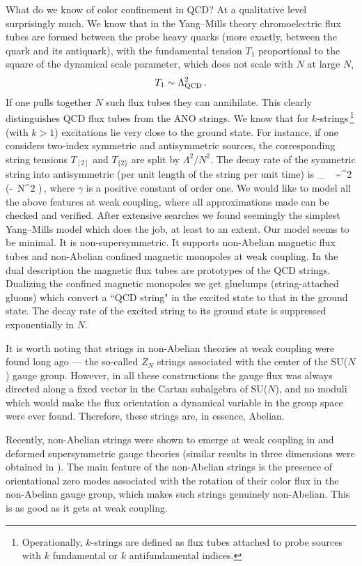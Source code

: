 What do we know of color confinement in QCD?
At a qualitative level surprisingly much.
We know that in the Yang--Mills theory
chromoelectric flux tubes are formed
between the probe heavy quarks (more exactly,
between the quark and its antiquark),
with the fundamental tension $T_1$ proportional to the square of the
dynamical scale parameter, which does not scale with $N$
at large $N$,
$$
T_1 \sim \Lambda^2_{\rm QCD}\, .
$$
If one pulls together $N$ such flux tubes
they can annihilate. This clearly distinguishes
QCD flux tubes from the ANO strings. We know that
for $k$-strings\,\footnote{Operationally,
$k$-strings are defined as flux tubes attached to probe sources
with $k$ fundamental or $k$ antifundamental indices.} (with $k>1$) excitations 
lie very close
to the ground state. For instance, if one considers
two-index symmetric and antisymmetric sources, the corresponding
string tensions $T_{[2]}$ and
$T_{\{2\}}$ are split 
\cite{Armoni-two} by $\Lambda^2/N^2$.
The decay rate 
of the symmetric string into antisymmetric (per unit length of the string per unit time)
is  
\beq
\Gamma_{\symm\,\, \to\, \asymm}\sim \Lambda^2 \exp\left(-\gamma \, N^2 \right)\,,
\label{expdec} 
\eeq
where $\gamma$ is a positive constant of  order one.
We would like to model all the above features at weak coupling,
where all approximations made can be checked and verified.
After extensive searches we found seemingly the simplest
Yang--Mills model which does the job, at least to an extent.
Our model seems to be minimal. It is non-supersymmetric.
It supports non-Abelian 
magnetic flux tubes and non-Abelian confined magnetic monopoles
at weak coupling.
In the dual description the magnetic flux tubes are prototypes
of the QCD strings. Dualizing the confined magnetic monopoles
we get gluelumps (string-attached gluons)
 which convert a ``QCD string" in the excited state
to that in the ground state. The decay rate of the excited string
to its ground state is suppressed exponentially in $N$.

It is worth  noting that strings
in non-Abelian theories at weak coupling were found long ago 
\cite{oldstrings} --- the so-called $Z_N$ strings associated with the center of 
the  SU($N$) gauge group. However, in all these constructions the gauge flux
was always directed along a fixed vector in the Cartan subalgebra 
of SU($N$), and no
moduli which would make the flux orientation
a dynamical variable  in the group space were ever found.
Therefore, these strings are, in essence, Abelian.

Recently, non-Abelian strings were shown to emerge at weak coupling 
\cite{Auzzi,ShifmanYung,HananyTong,Markov} in \ntwo and deformed \nfour
supersymmetric gauge theories  
(similar results in three dimensions were obtained in \cite{Hanany}). 
The  main feature of  the non-Abelian strings is the
presence of orientational zero modes associated with the rotation of their
color flux in the non-Abelian gauge group, which makes such  strings 
genuinely non-Abelian. This is as good as it gets at weak coupling.

